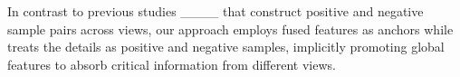 In contrast to previous studies ____ that construct positive and negative sample pairs across views, our approach employs fused features as anchors while treats the details as positive and negative samples, implicitly promoting global features to absorb critical information from different views.

